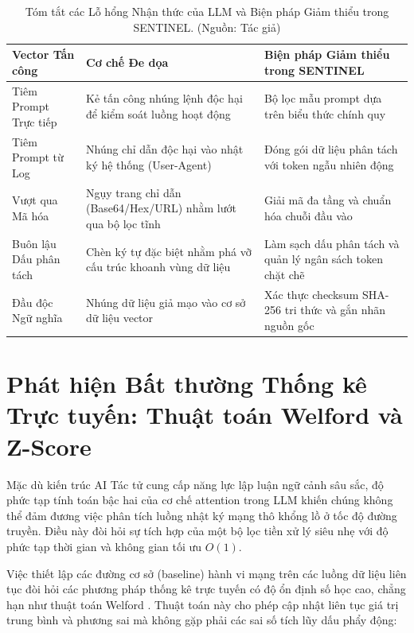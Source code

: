 \begin{table}[!htbp]
    \centering
    \caption{Tóm tắt các Lỗ hổng Nhận thức của LLM và Biện pháp Giảm thiểu trong SENTINEL. (Nguồn: Tác giả)}
    \label{tab:vulnerabilities_mitigations}
    \begin{tabular}{|>{\raggedright\arraybackslash}p{}|>{\raggedright\arraybackslash}p{}|>{\raggedright\arraybackslash}p{}|}
        \hline
        \textbf{Vector Tấn công} & \textbf{Cơ chế Đe dọa} & \textbf{Biện pháp Giảm thiểu trong SENTINEL} \\
        \hline
        Tiêm Prompt Trực tiếp & Kẻ tấn công nhúng lệnh độc hại để kiểm soát luồng hoạt động & Bộ lọc mẫu prompt dựa trên biểu thức chính quy \\
        \hline
        Tiêm Prompt từ Log & Nhúng chỉ dẫn độc hại vào nhật ký hệ thống (User-Agent) & Đóng gói dữ liệu phân tách với token ngẫu nhiên động \\
        \hline
        Vượt qua Mã hóa & Ngụy trang chỉ dẫn (Base64/Hex/URL) nhằm lướt qua bộ lọc tĩnh & Giải mã đa tầng và chuẩn hóa chuỗi đầu vào \\
        \hline
        Buôn lậu Dấu phân tách & Chèn ký tự đặc biệt nhằm phá vỡ cấu trúc khoanh vùng dữ liệu & Làm sạch dấu phân tách và quản lý ngân sách token chặt chẽ \\
        \hline
        Đầu độc Ngữ nghĩa & Nhúng dữ liệu giả mạo vào cơ sở dữ liệu vector & Xác thực checksum SHA-256 tri thức và gắn nhãn nguồn gốc \\
        \hline
    \end{tabular}
\end{table}

\section{Phát hiện Bất thường Thống kê Trực tuyến: Thuật toán Welford và Z-Score}
\label{sec:welford}

Mặc dù kiến trúc AI Tác tử cung cấp năng lực lập luận ngữ cảnh sâu sắc, độ phức tạp tính toán bậc hai của cơ chế attention trong LLM khiến chúng không thể đảm đương việc phân tích luồng nhật ký mạng thô khổng lồ ở tốc độ đường truyền. Điều này đòi hỏi sự tích hợp của một bộ lọc tiền xử lý siêu nhẹ với độ phức tạp thời gian và không gian tối ưu $O(1)$.

Việc thiết lập các đường cơ sở (baseline) hành vi mạng trên các luồng dữ liệu liên tục đòi hỏi các phương pháp thống kê trực tuyến có độ ổn định số học cao, chẳng hạn như thuật toán Welford \cite{welford1962}. Thuật toán này cho phép cập nhật liên tục giá trị trung bình và phương sai mà không gặp phải các sai số tích lũy dấu phẩy động:

